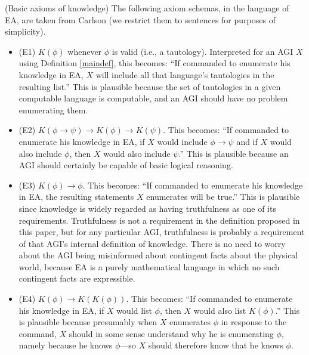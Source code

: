 \documentclass[runningheads]{llncs}
\begin{document}
\begin{example}
  (Basic axioms of knowledge) The following axiom schemas, in the language
  of EA, are taken from Carlson \cite{carlson}
  (we restrict them to sentences for purposes of simplicity).
  \begin{itemize}
    \item (E1) $K(\phi)$ whenever $\phi$ is valid (i.e., a tautology).
    Interpreted for an AGI $X$ using Definition \ref{maindef}, this becomes:
    ``If commanded to enumerate his knowledge in EA, $X$ will include
    all that language's tautologies in the resulting list.'' This is plausible
    because the set of tautologies in a given computable language is computable,
    and an AGI should have no problem enumerating them.
    \item (E2) $K(\phi\rightarrow\psi)\rightarrow K(\phi)\rightarrow K(\psi)$.
    This becomes: ``If commanded to enumerate his knowledge in EA,
    if $X$ would include $\phi\rightarrow\psi$ and if $X$ would also include
    $\phi$, then $X$ would also include $\psi$.'' This is plausible because
    an AGI should certainly be capable of basic logical reasoning.
    \item (E3) $K(\phi)\rightarrow\phi$. This becomes: ``If commanded to enumerate
    his knowledge in EA, the resulting statements $X$ enumerates
    will be true.'' This is plausible since knowledge is widely regarded as
    having truthfulness as one of its requirements. Truthfulness is not a
    requirement in the definition proposed in this paper, but for any particular
    AGI, truthfulness is probably a requirement of that AGI's internal definition
    of knowledge. There is no need to worry about the AGI being misinformed about
    contingent facts about the physical world, because EA is a purely mathematical
    language in which no such contingent facts are expressible.
    \item (E4) $K(\phi)\rightarrow K(K(\phi))$. This becomes: ``If commanded to
    enumerate his knowledge in EA, if $X$ would list $\phi$,
    then $X$ would also list $K(\phi)$.'' This is plausible because presumably
    when $X$ enumerates $\phi$ in response to the command, $X$ should in some sense
    understand why he is enumerating $\phi$, namely because he knows $\phi$---so $X$
    should therefore know that he knows $\phi$.
  \end{itemize}
\end{example}
\end{document}

